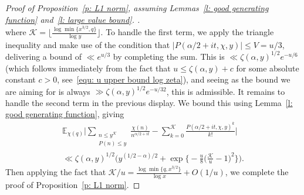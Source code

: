 \documentclass[10pt,a4paper]{amsart}
\newcommand{\E}{\mathbb{E}}
\begin{document}
\begin{proof}[Proof of Proposition~\ref{p: L1 norm}, assuming Lemmas~\ref{l: good generating function} and~\ref{l: large value bound}. ]
\[\]
where $\mathcal{K} = \lfloor \frac{\log \min \{ x^{3/2}, q \}}{\log y} \rfloor$. To handle the first term, we apply the triangle inequality and make use of the condition that $|P (\alpha/2 + it, \chi, y)| \leq V = u/3$, delivering a bound of $\ll e^{u/3}$ by completing the sum. This is $\ll \zeta (\alpha, y)^{1/2} e^{-u/6}$ (which follows immediately from the fact that $u \leq \zeta(\alpha, y) + c$ for some absolute constant $c>0$, see~\eqref{equ: u upper bound log zeta}), and seeing as the bound we are aiming for is always $\gg \zeta (\alpha, y)^{1/2} e^{-u/32}$, this is admissible. It remains to handle the second term in the previous display. We bound this using Lemma~\ref{l: good generating function}, giving
\begin{multline*}
\E_{\chi (q)} \biggl| \sum_{\substack{n \leq y^{\mathcal{K}} \\ P(n) \leq y}} \frac{\chi(n)}{n^{\alpha / 2 + it}} - \sum_{k = 0}^{\mathcal{K}} \frac{P (\alpha / 2 + it, \chi, y)^{k}}{k!} \biggr| \\ 
\ll \zeta (\alpha, y)^{1/2} \biggl(y^{(1/2 - \alpha)/2} + \exp \biggl\{ - \frac{u}{8} \biggl( \frac{\mathcal{K}}{u} -1 \biggr)^2 \biggr\} \biggr) .
\end{multline*}
Then applying the fact that $\mathcal{K}/u = \frac{\log \min\{ q, x^{3/2} \}}{\log x} + O(1/u)$, we complete the proof of Proposition~\ref{p: L1 norm}.
\end{proof}
\end{document}

